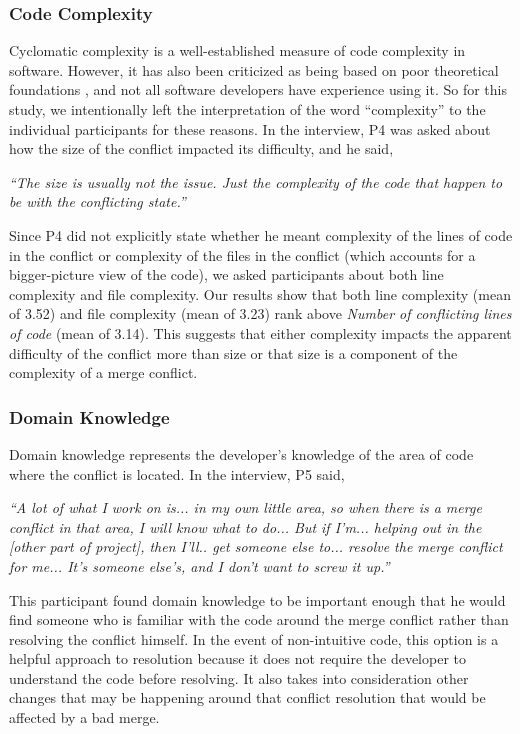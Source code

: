 \subsubsection{Code Complexity}
Cyclomatic complexity \cite{mccabe1976complexity} is a well-established measure of code complexity in software. However, it has also been criticized as being based on poor theoretical foundations \cite{Shepperd1988}, and not all software developers have experience using it. So for this study, we intentionally left the interpretation of the word ``complexity'' to the individual participants for these reasons.
In the interview, P4 was asked about how the size of the conflict impacted its difficulty, and he said,

\begin{displayquote}
\textit{``The size is usually not the issue. Just the complexity of the code that happen to be with the conflicting state.''}	
\end{displayquote}

Since P4 did not explicitly state whether he meant complexity of the lines of code in the conflict or complexity of the files in the conflict (which accounts for a bigger-picture view of the code), we asked participants about both line complexity and file complexity. Our results show that both line complexity (mean of 3.52) and file complexity (mean of 3.23) rank above \textit{Number of conflicting lines of code} (mean of 3.14). This suggests that either complexity impacts the apparent difficulty of the conflict more than size or that size is a component of the complexity of a merge conflict.

\subsubsection{Domain Knowledge}
Domain knowledge represents the developer's knowledge of the area of code where the conflict is located. In the interview, P5 said, 

\begin{displayquote}
	\textit{``A lot of what I work on is... in my own little area, so when there is a merge conflict in that area, I will know what to do... But if I'm... helping out in the [other part of project], then I'll.. get someone else to... resolve the merge conflict for me... It's someone else's, and I don't want to screw it up.''}
\end{displayquote}

This participant found domain knowledge to be important enough that he would find someone who is familiar with the code around the merge conflict rather than resolving the conflict himself. In the event of non-intuitive code, this option is a helpful approach to resolution because it does not require the developer to understand the code before resolving. It also takes into consideration other changes that may be happening around that conflict resolution that would be affected by a bad merge.

